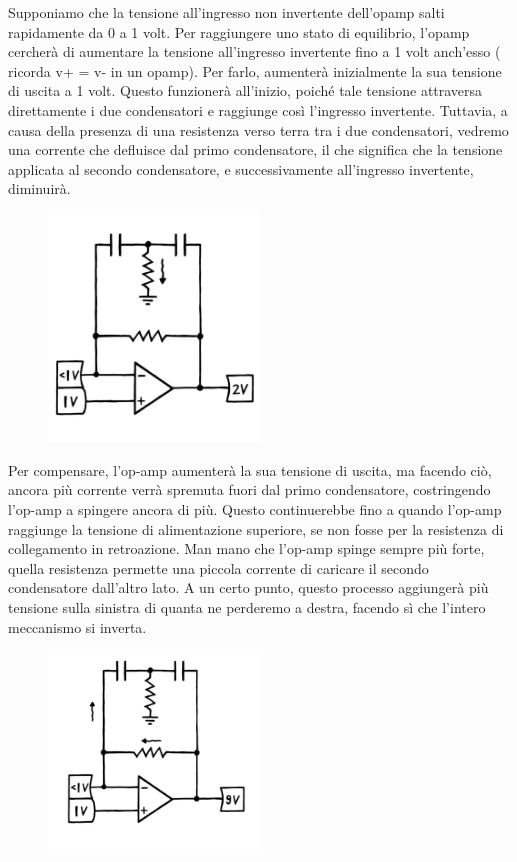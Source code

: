 \documentclass{article}
\theoremstyle{definition}
\begin{document}
 Supponiamo che la tensione all'ingresso non invertente dell'opamp salti rapidamente da 0 a 1 volt. Per raggiungere uno stato di equilibrio, l'opamp cercherà di aumentare la tensione all'ingresso invertente fino a 1 volt anch'esso ( ricorda v+ = v- in un opamp).
 Per farlo, aumenterà inizialmente la sua tensione di uscita a 1 volt. Questo funzionerà all'inizio, poiché tale tensione attraversa direttamente i due condensatori e raggiunge così l'ingresso invertente.
 Tuttavia, a causa della presenza di una resistenza verso terra tra i due condensatori, vedremo una corrente che defluisce dal primo condensatore, il che significa che la tensione applicata al secondo condensatore, e successivamente all'ingresso invertente, diminuirà.

\begin{figure}[ht]
    \centering
    \includegraphics[width=0.5\textwidth]{Toscillator2.png} 
    \label{fig:Toscillator2}
\end{figure}

Per compensare, l'op-amp aumenterà la sua tensione di uscita, ma facendo ciò, ancora più corrente verrà spremuta fuori dal primo condensatore, costringendo l'op-amp a spingere ancora di più.
Questo continuerebbe fino a quando l'op-amp raggiunge la tensione di alimentazione superiore, se non fosse per la resistenza di collegamento in retroazione.
Man mano che l'op-amp spinge sempre più forte, quella resistenza permette una piccola corrente di caricare il secondo condensatore dall'altro lato.
A un certo punto, questo processo aggiungerà più tensione sulla sinistra di quanta ne perderemo a destra, facendo sì che l'intero meccanismo si inverta.

\begin{figure}[ht]
    \centering
    \includegraphics[width=0.5\textwidth]{Toscillator3.png} 
    \label{fig:Toscillator3}
\end{figure}
\end{document}
